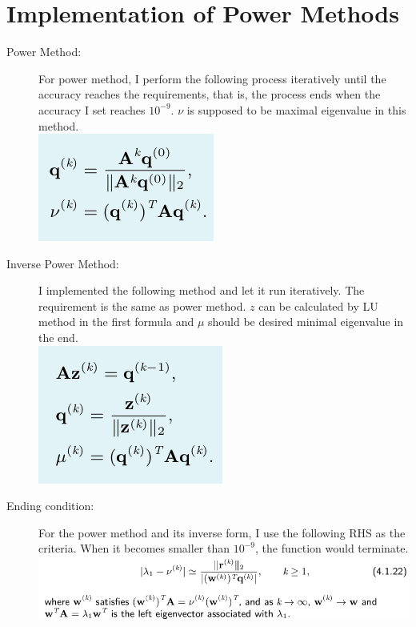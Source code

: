 \documentclass[12pt,a4paper]{article}
\begin{document}
\section{Implementation of Power Methods}
\begin{description}  

\item [Power Method:] For power method, I perform the following process iteratively until the accuracy reaches the requirements, that is, the process ends when the accuracy I set reaches $10^{-9}$.  $\nu$ is supposed to be maximal eigenvalue in this method.\\
\includegraphics[scale =0.6 ]{./power_method.png}\\

\item [Inverse Power Method:] I implemented the following method and let it run iteratively. The requirement is the same as power method. $z$ can be calculated by LU method in the first formula and $\mu$ should be desired minimal eigenvalue in the end.\\
\includegraphics[scale =0.6 ]{./inverse_power.png}\\

\item [Ending condition:] For the power method and its inverse form, I use the following RHS as the criteria. When it becomes smaller than $10^{-9}$, the function would terminate.\\
\includegraphics[scale =0.6 ]{./stopping_criteria.png}\\

\end{description}
\end{document}
